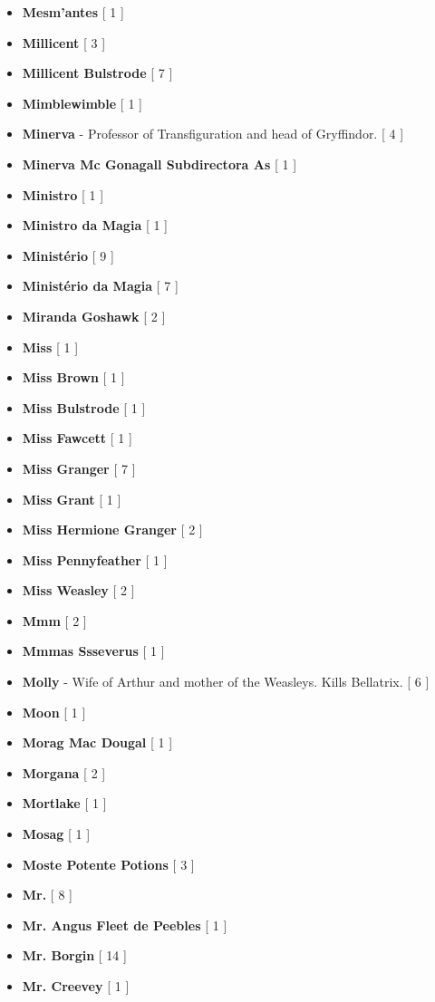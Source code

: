 \documentclass[a4paper]{article}
\begin{document}
{\begin{itemize}
	\item \textbf{Mesm'antes} [ 1 ]
	\item \textbf{Millicent} [ 3 ]
	\item \textbf{Millicent Bulstrode} [ 7 ]
	\item \textbf{Mimblewimble} [ 1 ]
	\item \textbf{Minerva} - Professor of Transfiguration and head of Gryffindor. [ 4 ]
	\item \textbf{Minerva Mc Gonagall Subdirectora As} [ 1 ]
	\item \textbf{Ministro} [ 1 ]
	\item \textbf{Ministro da Magia} [ 1 ]
	\item \textbf{Ministério} [ 9 ]
	\item \textbf{Ministério da Magia} [ 7 ]
	\item \textbf{Miranda Goshawk} [ 2 ]
	\item \textbf{Miss} [ 1 ]
	\item \textbf{Miss Brown} [ 1 ]
	\item \textbf{Miss Bulstrode} [ 1 ]
	\item \textbf{Miss Fawcett} [ 1 ]
	\item \textbf{Miss Granger} [ 7 ]
	\item \textbf{Miss Grant} [ 1 ]
	\item \textbf{Miss Hermione Granger} [ 2 ]
	\item \textbf{Miss Pennyfeather} [ 1 ]
	\item \textbf{Miss Weasley} [ 2 ]
	\item \textbf{Mmm} [ 2 ]
	\item \textbf{Mmmas Ssseverus} [ 1 ]
	\item \textbf{Molly} - Wife of Arthur and mother of the Weasleys. Kills Bellatrix. [ 6 ]
	\item \textbf{Moon} [ 1 ]
	\item \textbf{Morag Mac Dougal} [ 1 ]
	\item \textbf{Morgana} [ 2 ]
	\item \textbf{Mortlake} [ 1 ]
	\item \textbf{Mosag} [ 1 ]
	\item \textbf{Moste Potente Potions} [ 3 ]
	\item \textbf{Mr.} [ 8 ]
	\item \textbf{Mr. Angus Fleet de Peebles} [ 1 ]
	\item \textbf{Mr. Borgin} [ 14 ]
	\item \textbf{Mr. Creevey} [ 1 ]

\end{itemize}}
\end{document}
